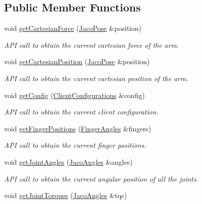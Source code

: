 \subsection*{Public Member Functions}
\begin{DoxyCompactItemize}
\item 
void \hyperlink{classjaco_1_1JacoComm_af181d7ddd7baeff6e46720648e7e1f31}{get\+Cartesian\+Force} (\hyperlink{classjaco_1_1JacoPose}{Jaco\+Pose} \&position)
\begin{DoxyCompactList}\small\item\em A\+PI call to obtain the current cartesian force of the arm. \end{DoxyCompactList}\item 
void \hyperlink{classjaco_1_1JacoComm_a855bbefed2093d0d0cc7763eb7306a0b}{get\+Cartesian\+Position} (\hyperlink{classjaco_1_1JacoPose}{Jaco\+Pose} \&position)
\begin{DoxyCompactList}\small\item\em A\+PI call to obtain the current cartesian position of the arm. \end{DoxyCompactList}\item 
void \hyperlink{classjaco_1_1JacoComm_a47a3557e9b5576bc83df936caa043270}{get\+Config} (\hyperlink{KinovaTypes_8h_d1/d2e/structClientConfigurations}{Client\+Configurations} \&config)
\begin{DoxyCompactList}\small\item\em A\+PI call to obtain the current client configuration. \end{DoxyCompactList}\item 
void \hyperlink{classjaco_1_1JacoComm_a7644bf1154b59bf4d8b97c200284e3fb}{get\+Finger\+Positions} (\hyperlink{classjaco_1_1FingerAngles}{Finger\+Angles} \&fingers)
\begin{DoxyCompactList}\small\item\em A\+PI call to obtain the current finger positions. \end{DoxyCompactList}\item 
void \hyperlink{classjaco_1_1JacoComm_a5fcb23bf6925a82f2ab5e42460ea3834}{get\+Joint\+Angles} (\hyperlink{classjaco_1_1JacoAngles}{Jaco\+Angles} \&angles)
\begin{DoxyCompactList}\small\item\em A\+PI call to obtain the current angular position of all the joints. \end{DoxyCompactList}\item 
void \hyperlink{classjaco_1_1JacoComm_af2ba4b35149e292fa5279768d47216cb}{get\+Joint\+Torques} (\hyperlink{classjaco_1_1JacoAngles}{Jaco\+Angles} \&tqs)

\end{DoxyCompactItemize}

